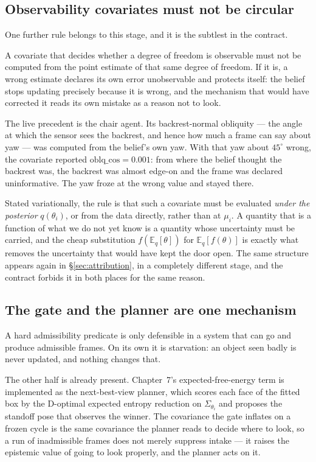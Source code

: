 \documentclass[11pt,a4paper]{report}
\begin{document}
\subsection{Observability covariates must not be circular}
\label{sec:circular}

One further rule belongs to this stage, and it is the subtlest in the contract.

A covariate that decides whether a degree of freedom is observable must not be computed from the
point estimate of that same degree of freedom. If it is, a wrong estimate declares its own error
unobservable and protects itself: the belief stops updating precisely because it is wrong, and the
mechanism that would have corrected it reads its own mistake as a reason not to look.

The live precedent is the chair agent. Its backrest-normal obliquity --- the angle at which the
sensor sees the backrest, and hence how much a frame can say about yaw --- was computed from the
belief's own yaw. With that yaw about $45^\circ$ wrong, the covariate reported
$\mathrm{oblq\_cos}=0.001$: from where the belief thought the backrest was, the backrest was almost
edge-on and the frame was declared uninformative. The yaw froze at the wrong value and stayed there.

Stated variationally, the rule is that such a covariate must be evaluated \emph{under the posterior}
$q(\theta_i)$, or from the data directly, rather than at $\mu_i$. A quantity that is a function of
what we do not yet know is a quantity whose uncertainty must be carried, and the cheap substitution
$f(\mathbb{E}_q[\theta])$ for $\mathbb{E}_q[f(\theta)]$ is exactly what removes the uncertainty that
would have kept the door open. The same structure appears again in \S\ref{sec:attribution}, in a
completely different stage, and the contract forbids it in both places for the same reason.

\subsection{The gate and the planner are one mechanism}

A hard admissibility predicate is only defensible in a system that can go and produce admissible
frames. On its own it is starvation: an object seen badly is never updated, and nothing changes
that.

The other half is already present. Chapter~7's expected-free-energy term is implemented as the
next-best-view planner, which scores each face of the fitted box by the D-optimal expected entropy
reduction on $\Sigma_{\theta_i}$ and proposes the standoff pose that observes the winner. The
covariance the gate inflates on a frozen cycle is the same covariance the planner reads to decide
where to look, so a run of inadmissible frames does not merely suppress intake --- it raises the
epistemic value of going to look properly, and the planner acts on it.
\end{document}
